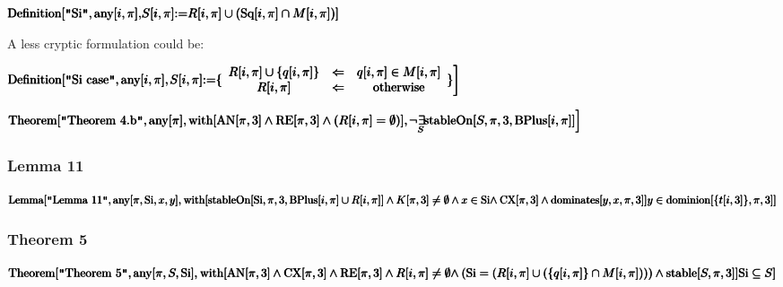 \documentclass{article}
\begin{document}
\noindent\(\pmb{\text{Definition}[\text{$\texttt{"}$Si$\texttt{"}$},\text{any}[i,\pi ],}\\
\pmb{S[i,\pi ]\text{:=}R[i,\pi ]\cup (\text{Sq}[i,\pi ]\cap M[i,\pi ])]}\)

A less cryptic formulation could be:

\noindent\(\pmb{\text{Definition}[\text{$\texttt{"}$Si case$\texttt{"}$},\text{any}[i,\pi ],}\\
\pmb{\left.S[i,\pi ]\text{:=}\{
\begin{array}{ccc}
 R[i,\pi ]\cup \{q[i,\pi ]\} & \Leftarrow  & q[i,\pi ]\in M[i,\pi ] \\
 R[i,\pi ] & \Leftarrow  & \text{otherwise}
\end{array}
\} \right]}\)

\noindent\(\pmb{\text{Theorem}[\text{$\texttt{"}$Theorem 4.b$\texttt{"}$}, \text{any}[\pi ],\text{with}[\text{AN}[\pi ,3]\land \text{RE}[\pi ,3]\land
(R[i,\pi ]=\emptyset )],}\\
\pmb{\left.\neg \underset{S}{\exists \! }\text{stableOn}[S,\pi ,3,\text{BPlus}[i,\pi ]]\right]}\)

\subsubsection*{Lemma 11}

\noindent\(\pmb{\text{Lemma}[\text{$\texttt{"}$Lemma 11$\texttt{"}$},\text{any}[\pi ,\text{Si},x,y],}\\
\pmb{\text{with}[\text{stableOn}[\text{Si},\pi ,3,\text{BPlus}[i,\pi ]\cup R[i,\pi ]]\land K[\pi ,3]\neq \emptyset \land x\in \text{Si}\land }\\
\pmb{\text{CX}[\pi ,3]\land \text{dominates}[y,x,\pi ,3]]}\\
\pmb{y\in \text{dominion}[\{t[i,3]\},\pi ,3]]}\)

\subsubsection*{Theorem 5}

\noindent\(\pmb{\text{Theorem}[\text{$\texttt{"}$Theorem 5$\texttt{"}$},\text{any}[\pi ,S,\text{Si}],}\\
\pmb{\text{with}[\text{AN}[\pi ,3]\land \text{CX}[\pi ,3]\land \text{RE}[\pi ,3]\land R[i,\pi ]\neq \emptyset \land }\\
\pmb{(\text{Si}=(R[i,\pi ]\cup (\{q[i,\pi ]\}\cap M[i,\pi ])))\land \text{stable}[S,\pi ,3]]}\\
\pmb{\text{Si}\subseteq S]}\)
\end{document}
